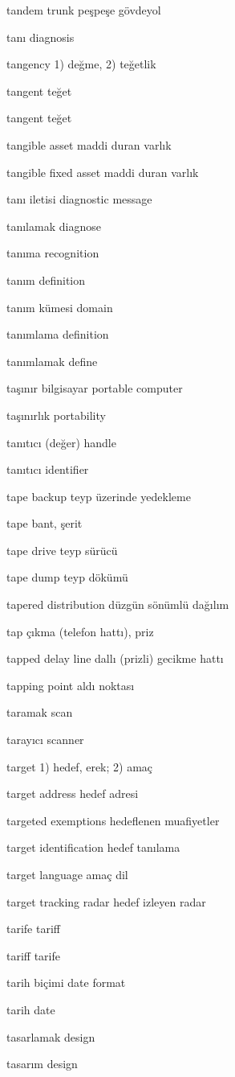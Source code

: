 \documentclass[12pt,fleqn]{article}\usepackage{../../common}
\begin{document}
tandem trunk peşpeşe gövdeyol

tanı diagnosis

tangency 1) değme, 2) teğetlik

tangent teğet

tangent teğet

tangible asset maddi duran varlık

tangible fixed asset maddi duran varlık

tanı iletisi diagnostic message

tanılamak diagnose

tanıma recognition

tanım definition

tanım kümesi domain

tanımlama definition

tanımlamak define

taşınır bilgisayar portable computer

taşınırlık portability

tanıtıcı (değer) handle

tanıtıcı identifier

tape backup teyp üzerinde yedekleme

tape bant, şerit

tape drive teyp sürücü

tape dump teyp dökümü

tapered distribution düzgün sönümlü dağılım

tap çıkma (telefon hattı), priz

tapped delay line dallı (prizli) gecikme hattı

tapping point aldı noktası

taramak scan

tarayıcı scanner

target 1) hedef, erek; 2) amaç

target address hedef adresi

targeted exemptions hedeflenen muafiyetler

target identification hedef tanılama

target language amaç dil

target tracking radar hedef izleyen radar

tarife tariff

tariff tarife

tarih biçimi date format

tarih date

tasarlamak design

tasarım design
\end{document}
